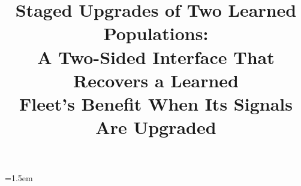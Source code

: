 
\usepackage{multirow}
\usepackage[section]{placeins}
\renewcommand{\topfraction}{0.9}\renewcommand{\dbltopfraction}{0.9}\renewcommand{\floatpagefraction}{0.6}\renewcommand{\dblfloatpagefraction}{0.6}
\setcounter{totalnumber}{5}\setcounter{dbltopnumber}{3}
\emergencystretch=1.5em



\title{Staged Upgrades of Two Learned Populations:\\
A Two-Sided Interface That Recovers a Learned\\
Fleet's Benefit When Its Signals Are Upgraded}

\author{
}

\maketitle

